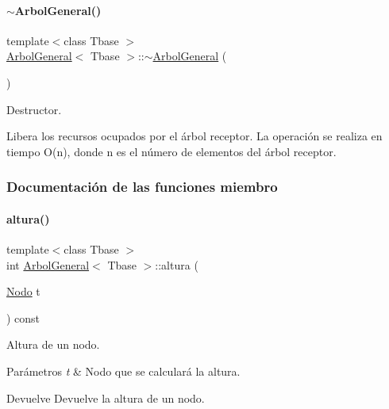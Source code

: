 \paragraph{\texorpdfstring{$\sim$\+Arbol\+General()}{~ArbolGeneral()}}
{\footnotesize\ttfamily template$<$class Tbase $>$ \\
\hyperlink{classArbolGeneral}{Arbol\+General}$<$ Tbase $>$\+::$\sim$\hyperlink{classArbolGeneral}{Arbol\+General} (\begin{DoxyParamCaption}{ }\end{DoxyParamCaption})}



Destructor. 

Libera los recursos ocupados por el árbol receptor. La operación se realiza en tiempo O(n), donde n es el número de elementos del árbol receptor. 

\subsubsection{Documentación de las funciones miembro}
\hypertarget{classArbolGeneral_a6876f408388bbe7cead25c4caeb0ea72}{}\label{classArbolGeneral_a6876f408388bbe7cead25c4caeb0ea72} 
\paragraph{\texorpdfstring{altura()}{altura()}}
{\footnotesize\ttfamily template$<$class Tbase $>$ \\
int \hyperlink{classArbolGeneral}{Arbol\+General}$<$ Tbase $>$\+::altura (\begin{DoxyParamCaption}\item[{\hyperlink{classArbolGeneral_a12cc1b74a9095d89bc7334290d332f7a}{Nodo}}]{t }\end{DoxyParamCaption}) const}



Altura de un nodo. 


\begin{DoxyParams}{Parámetros}
{\em t} & Nodo que se calculará la altura. \\
\hline
\end{DoxyParams}
\begin{DoxyReturn}{Devuelve}
Devuelve la altura de un nodo. 
\end{DoxyReturn}
\hypertarget{classArbolGeneral_ad9fddc80b179cac8eddc113a048334c1}{}\label{classArbolGeneral_ad9fddc80b179cac8eddc113a048334c1} 
